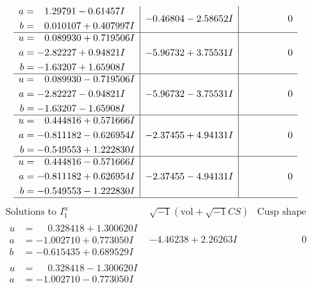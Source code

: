 \documentclass[1p]{elsarticle_modified}
\theoremstyle{definition}
\newcommand{\I}{\sqrt{-1}}
\begin{document}
$$\begin{array}{c|c|c}
\begin{aligned}
a &= \phantom{-}1.29791 - 0.61457 I \\
b &= \phantom{-}0.010107 + 0.407997 I\end{aligned}
 & -0.46804 - 2.58652 I & \phantom{-0.000000 } 0 \\ \hline\begin{aligned}
u &= \phantom{-}0.089930 + 0.719506 I \\
a &= -2.82227 + 0.94821 I \\
b &= -1.63207 + 1.65908 I\end{aligned}
 & -5.96732 + 3.75531 I & \phantom{-0.000000 } 0 \\ \hline\begin{aligned}
u &= \phantom{-}0.089930 - 0.719506 I \\
a &= -2.82227 - 0.94821 I \\
b &= -1.63207 - 1.65908 I\end{aligned}
 & -5.96732 - 3.75531 I & \phantom{-0.000000 } 0 \\ \hline\begin{aligned}
u &= \phantom{-}0.444816 + 0.571666 I \\
a &= -0.811182 - 0.626954 I \\
b &= -0.549553 + 1.222830 I\end{aligned}
 & -2.37455 + 4.94131 I & \phantom{-0.000000 } 0 \\ \hline\begin{aligned}
u &= \phantom{-}0.444816 - 0.571666 I \\
a &= -0.811182 + 0.626954 I \\
b &= -0.549553 - 1.222830 I\end{aligned}
 & -2.37455 - 4.94131 I & \phantom{-0.000000 } 0\\
 \hline 
 \end{array}$$\newpage$$\begin{array}{c|c|c}  
\text{Solutions to }I^u_{1}& \I (\text{vol} + \sqrt{-1}CS) & \text{Cusp shape}\\
 \hline 
\begin{aligned}
u &= \phantom{-}0.328418 + 1.300620 I \\
a &= -1.002710 + 0.773050 I \\
b &= -0.615435 + 0.689529 I\end{aligned}
 & -4.46238 + 2.26263 I & \phantom{-0.000000 } 0 \\ \hline\begin{aligned}
u &= \phantom{-}0.328418 - 1.300620 I \\
a &= -1.002710 - 0.773050 I \\

\end{aligned}
\end{array}$$
\end{document}
